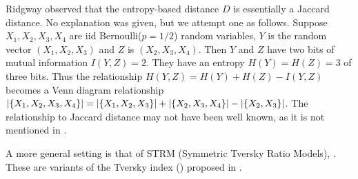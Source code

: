 		\begin{remark}
			Ridgway \cite{wiki:xxx} observed that the entropy-based distance $D$  is essentially a
			Jaccard distance. No explanation was given, but we attempt one as follows.
			Suppose $X_1,X_2,X_3,X_4$ are iid Bernoulli($p=1/2$) random variables, $Y$ is the random vector $(X_1,X_2,X_3)$ and $Z$ is $(X_2,X_3,X_4)$.
			Then $Y$ and $Z$ have two bits of mutual information $I(Y,Z)=2$.
			They have an entropy $H(Y)=H(Z)=3$ of three bits. Thus the relationship $H(Y,Z)=H(Y)+H(Z)-I(Y,Z)$
			becomes a Venn diagram relationship $\lvert\{X_1,X_2,X_3,X_4\}\rvert = \lvert\{X_1,X_2,X_3\}\rvert + \lvert\{X_2,X_3,X_4\}\rvert - \lvert\{X_2,X_3\}\rvert$.
			The relationship to Jaccard distance may not have been well known, as it is not mentioned in \cite{Kraskov_2005,10.1109/TKDE.2007.48,Li2001AnIS,1412045}.
		\end{remark}


		A more general setting is that of STRM (Symmetric Tversky Ratio Models), .
		These are variants of the Tversky index () %
		proposed in \cite{DBLP:conf/starsem/JimenezBG13}.

